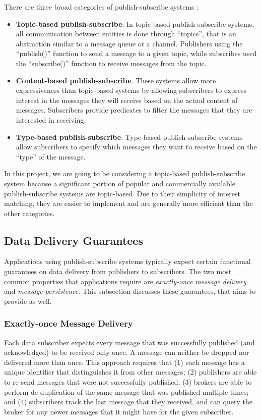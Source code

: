 There are three broad categories of publish-subscribe systems \cite{eugster2003many}:
\begin{itemize}
\item \textbf{Topic-based publish-subscribe}: In topic-based publish-subscribe systems, all communication between entities is done through ``topics'', that is an abstraction similar to a message queue or a channel. Publishers using the ``publish()'' function to send a message to a given topic, while subscribes used the ``subscribe()'' function to receive messages from the topic.
\item \textbf{Content-based publish-subscribe}. These systems allow more expressiveness than topic-based systems by allowing subscribers to express interest in the messages they will receive based on the actual content of messages. Subscribers provide predicates to filter the messages that they are interested in receiving.
\item \textbf{Type-based publish-subscribe}. Type-based publish-subscribe systems allow subscribers to specify which messages they want to receive based on the ``type'' of the message. 
\end{itemize}
In this project, we are going to be considering a topic-based publish-subscribe system because a significant portion of popular and commercially available publish-subscribe systems are topic-based. Due to their simplicity of interest matching, they are easier to implement and are generally more efficient than the other categories. 

\subsection{Data Delivery Guarantees}
Applications using publish-subscribe systems typically expect certain functional guarantees on data delivery from publishers to subscribers. The two most common properties that applications require are \textit{exactly-once message delivery} and \textit{message persistence}. This subsection discusses these guarantees, that \epulsar{} aims to provide as well.
\subsubsection{Exactly-once Message Delivery}
Each data subscriber expects every message that was successfully published (and acknowledged) to be received only once. A message can neither be dropped nor delivered more than once. This approach requires that (1) each message has a unique identifier that distinguishes it from other messages; (2) publishers are able to re-send messages that were not successfully published; (3) brokers are able to perform de-duplication of the same message that was published multiple times; and (4) subscribers track the last message that they received, and can query the broker for any newer messages that it might have for the given subscriber. 

